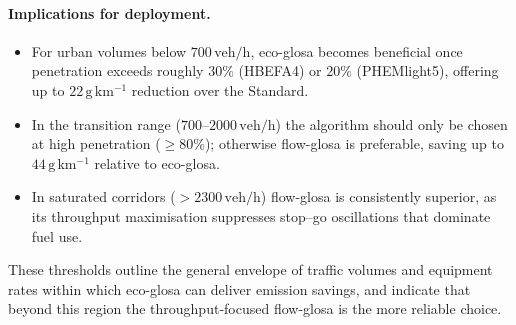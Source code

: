 \paragraph{Implications for deployment.}
\begin{itemize}
  \item For urban volumes below $700\,\mathrm{veh/h}$, \ac{eco-glosa} becomes beneficial once penetration exceeds roughly $30\%$ (HBEFA4) or $20\%$ (PHEMlight5), offering up to $22\,\mathrm{g\,km^{-1}}$ reduction over the Standard.
  \item In the transition range ($700$–$2000\,\mathrm{veh/h}$) the algorithm should only be chosen at high penetration ($\geq80\%$); otherwise \ac{flow-glosa} is preferable, saving up to $44\,\mathrm{g\,km^{-1}}$ relative to \ac{eco-glosa}.
  \item In saturated corridors ($>2300\,\mathrm{veh/h}$) \ac{flow-glosa} is consistently superior, as its throughput maximisation suppresses stop–go oscillations that dominate fuel use.
\end{itemize}

These thresholds outline the general envelope of traffic volumes and equipment rates within which \ac{eco-glosa} can deliver emission savings, and indicate that beyond this region the throughput‐focused \ac{flow-glosa} is the more reliable choice.  

